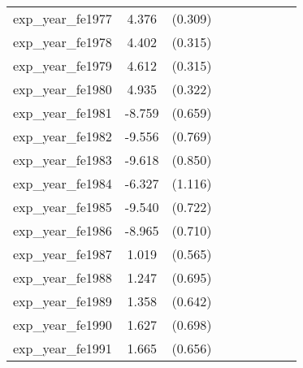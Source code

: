 {\begin{tabular}{l*{4}{cc}}
exp\_year\_fe1977&    4.376\sym{***}&  (0.309)&                  &         &                  &         &                  &         \\
exp\_year\_fe1978&    4.402\sym{***}&  (0.315)&                  &         &                  &         &                  &         \\
exp\_year\_fe1979&    4.612\sym{***}&  (0.315)&                  &         &                  &         &                  &         \\
exp\_year\_fe1980&    4.935\sym{***}&  (0.322)&                  &         &                  &         &                  &         \\
exp\_year\_fe1981&   -8.759\sym{***}&  (0.659)&                  &         &                  &         &                  &         \\
exp\_year\_fe1982&   -9.556\sym{***}&  (0.769)&                  &         &                  &         &                  &         \\
exp\_year\_fe1983&   -9.618\sym{***}&  (0.850)&                  &         &                  &         &                  &         \\
exp\_year\_fe1984&   -6.327\sym{***}&  (1.116)&                  &         &                  &         &                  &         \\
exp\_year\_fe1985&   -9.540\sym{***}&  (0.722)&                  &         &                  &         &                  &         \\
exp\_year\_fe1986&   -8.965\sym{***}&  (0.710)&                  &         &                  &         &                  &         \\
exp\_year\_fe1987&    1.019         &  (0.565)&                  &         &                  &         &                  &         \\
exp\_year\_fe1988&    1.247         &  (0.695)&                  &         &                  &         &                  &         \\
exp\_year\_fe1989&    1.358\sym{*}  &  (0.642)&                  &         &                  &         &                  &         \\
exp\_year\_fe1990&    1.627\sym{*}  &  (0.698)&                  &         &                  &         &                  &         \\
exp\_year\_fe1991&    1.665\sym{*}  &  (0.656)&                  &         &                  &         &                  &         \\

\end{tabular}}
